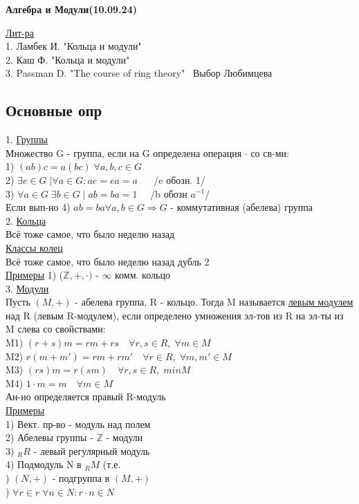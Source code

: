 \documentclass[12pt]{article}
\begin{document}
\begin{center}
\textbf{Алгебра и Модули(10.09.24)}
\end{center}

\underline{Лит-ра} \\
1. Ламбек И. "Кольца и модули" \\
2. Каш Ф. "Кольца и модули"\\
3. Passman D. "The course of ring theory" \ Выбор Любимцева \\

\subsection*{Основные опр} 
1. \underline{Группы}  \\
Множество G - группа, если на G определена операция $\cdot $ со св-ми: \\
1) $(ab)c = a(bc) \; \forall a,b,c \in G $ \\
2) $ \exists e \in G \; | \forall a \in G: ae=ea=a $ $\quad $ /e обозн. 1/ \\
3) $ \forall a \in G \; \exists b \in G \; | \; ab=ba=1 \quad $ /b обозн $a^{-1}$/ \\
Если вып-но 4) $ab=ba \forall a,b\in G \Rightarrow G$ - коммутативная (абелева)
группа \\

2. \underline{Кольца} \\ 
Всё тоже самое, что было неделю назад\\
\underline{Классы колец} \\
Всё тоже самое, что было неделю назад дубль 2\\
\underline{Примеры} 1) ($ \mathbb{Z}, +, \cdot) \text{ - } \infty \text{ комм. кольцо} $ \\

3. \underline{Модули} \\
Пусть $(M, +)$ - абелева группа, R - кольцо. Тогда M называется \underline{левым модулем}
над R (левым R-модулем), если определено умножения эл-тов из R на эл-ты из M слева
со свойствами:\\
M1) $(r+s)m = rm + rs \quad \forall r,s \in R, \; \forall m\in M$ \\
M2) $ r(m + m') = rm+ rm' \quad \forall r \in R, \; \forall m, m' \in M $ \\
M3) $(rs)m = r(sm) \quad \forall r,s \in R, \; m in M $ \\
M4) $ 1 \cdot m = m \quad \forall m \in M $ \\
Ан-но определяется правый R-модуль\\
\underline{Примеры} \\
1) Вект. пр-во - модуль над полем \\
2) Абелевы группы - $\mathbb{Z}$ - модули \\
3) $_RR$ - левый регулярный модуль \\
4) Подмодуль N в $_RM$ (т.е. \\
) $ (N, +) $ - подгруппа в $(M, +)$ \\
) $\forall r \in r \; \forall n\in N: r \cdot n \in N $\\
\end{document}

